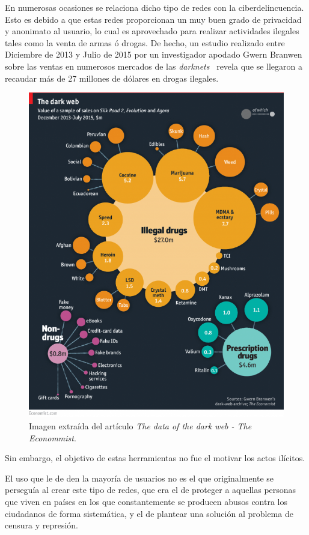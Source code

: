 En numerosas ocasiones se relaciona dicho tipo de redes con la ciberdelincuencia. Esto es debido a que estas redes proporcionan un muy buen grado de privacidad y anonimato al usuario, lo cual es aprovechado para realizar actividades ilegales tales como la venta de armas ó drogas. 
De hecho, un estudio realizado entre Diciembre de 2013 y Julio de 2015 por un investigador apodado Gwern Branwen sobre las ventas en numerosos mercados de las \textit{darknets}~\cite{article:gwern} revela que se llegaron a recaudar más de 27 millones de dólares en drogas ilegales.

\begin{figure}[h]
	\centerline{
		\mbox{\includegraphics[width=5.00in]{images/darknet_markets.png}}
	}
	\caption{Imagen extraída del artículo \textit{The data of the dark web - The Econommist}.~\cite{article:gwern}}
	\label{fig:norm_Daugman}
\end{figure}

Sin embargo, el objetivo de estas herramientas no fue el motivar los actos ilícitos. 

El uso que le de den la mayoría de usuarios no es el que originalmente se perseguía al crear este tipo de redes, que era el de proteger a aquellas personas que viven en países en los que constantemente se producen abusos contra los ciudadanos de forma sistemática, y el de plantear una solución al problema de censura y represión.

